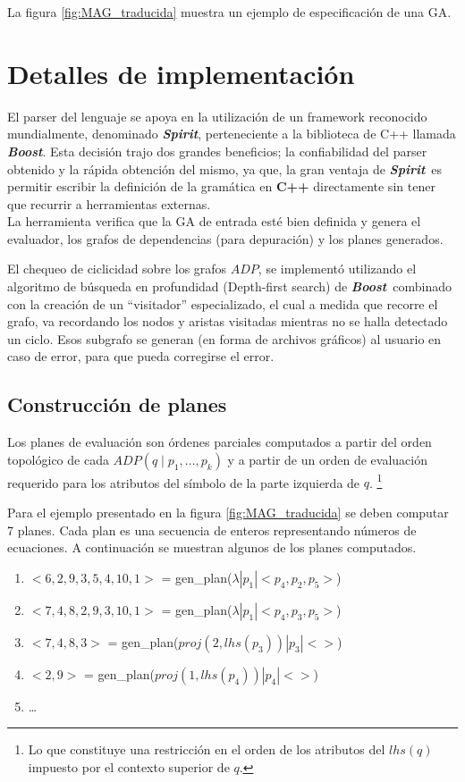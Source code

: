 \documentclass[a4paper]{article}
\newcommand{\boost}{\textit{\textbf{Boost}}}
\newcommand{\spirit}{\textit{\textbf{Spirit}}}
\begin{document}
La figura \ref{fig:MAG_traducida} muestra un ejemplo de especificación de una GA.

\section{Detalles de implementación}
\vspace{-0.22cm}

El parser del lenguaje se apoya en la utilización de un framework reconocido mundialmente, denominado \spirit, perteneciente a la biblioteca de C++ llamada \boost\cite{boost}. Esta decisión trajo dos grandes beneficios; la confiabilidad del parser obtenido y la rápida obtención del mismo, ya que, la gran ventaja de \spirit\ es permitir escribir la definición de la gramática en
\textbf{C++} directamente sin tener que recurrir a herramientas externas. \\

La herramienta verifica que la GA de entrada esté bien definida y genera el evaluador,
los grafos de dependencias (para depuración) y los planes generados.

El chequeo de ciclicidad sobre los grafos $ADP$, se implementó utilizando el algoritmo de búsqueda en profundidad (Depth-first search) de \boost\ combinado con la creación de un ``visitador'' especializado, el cual a medida que recorre el grafo, va recordando los nodos y aristas visitadas mientras no se halla detectado un ciclo. Esos subgrafo se generan
(en forma de archivos gráficos) al usuario en caso de error, para que pueda corregirse el
error.

\subsection{Construcción de planes}
\label{subsec:const-planes}

Los planes de evaluación son órdenes parciales computados a partir del orden topológico de 
cada $ADP(q \mid p_1, \ldots, p_k)$ y a partir de un orden de evaluación requerido para los atributos del símbolo de la parte izquierda de $q$.%
\footnote{Lo que constituye una restricción en el orden de los atributos del $lhs(q)$ impuesto por el contexto superior de $q$.}

Para el ejemplo presentado en la figura \ref{fig:MAG_traducida} se deben computar 7 planes.
Cada plan es una secuencia de enteros representando números de ecuaciones. A continuación se 
muestran algunos de los planes computados.

\begin{enumerate}
\item $<6,2,9,3,5,4,10,1>$ = gen\_plan($\lambda| p_1 | <p_4,p_2,p_5>$)
\item $<7,4,8,2,9,3,10,1>$ = gen\_plan($\lambda| p_1 | <p_4,p_3,p_5>$)
\item $<7,4,8,3>$ = gen\_plan($proj(2,lhs(p_3)) | p_3 | <>$)
\item $<2,9>$ = gen\_plan($proj(1,lhs(p_4)) | p_4 | <>$)
\item \ldots
\end{enumerate}
\end{document}
